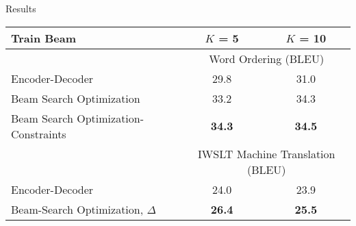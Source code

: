 

\begin{frame}{Results}
  \vspace{-0.2cm}
  \begin{table}
  \centering
    \footnotesize
  \begin{tabular}{lcc}
    \toprule
    Train Beam & $K$ = 5 & $K$ = 10 \\
    \midrule
     & \multicolumn{2}{c}{Word Ordering (BLEU) } \\
    \midrule
    Encoder-Decoder & 29.8 & 31.0 \\
    Beam Search Optimization     & 33.2 & 34.3 \\
    Beam Search Optimization-Constraints &  \textbf{34.3} & \textbf{34.5} \\
    \midrule




    \midrule

    & \multicolumn{2}{c}{IWSLT Machine Translation (BLEU) } \\
    \midrule
    Encoder-Decoder & 24.0 & 23.9 \\
    Beam-Search Optimization, $\Delta$  &  \textbf{26.4} & \textbf{25.5} \\
    \bottomrule
  \end{tabular}
  \label{tab:mtfinal}
\end{table}

\end{frame}


